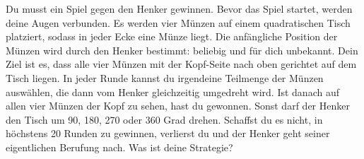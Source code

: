 \documentclass{uebung_cs}
\begin{document}
\begin{aufgabe}
    Du musst ein Spiel gegen den Henker gewinnen. Bevor das Spiel startet, werden deine Augen verbunden. Es werden vier Münzen auf einem quadratischen Tisch platziert, sodass in jeder Ecke eine Münze liegt. Die anfängliche Position der Münzen wird durch den Henker bestimmt: beliebig und für dich unbekannt. Dein Ziel ist es, dass alle vier Münzen mit der Kopf-Seite nach oben gerichtet auf dem Tisch liegen. In jeder Runde kannst du irgendeine Teilmenge der Münzen auswählen, die dann vom Henker gleichzeitig umgedreht wird. Ist danach auf allen vier Münzen der Kopf zu sehen, hast du gewonnen. Sonst darf der Henker den Tisch um 90, 180, 270 oder 360 Grad drehen. Schaffst du es nicht, in höchstens 20 Runden zu gewinnen, verlierst du und der Henker geht seiner eigentlichen Berufung nach. Was ist deine Strategie?
\end{aufgabe}
\end{document}
